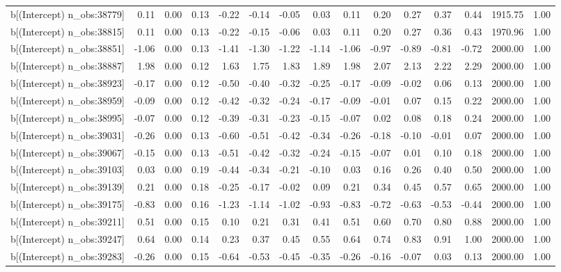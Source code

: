 \begin{table}[ht]
\begin{tabular}{rrrrrrrrrrrrrrr}
  b[(Intercept) n\_obs:38779] & 0.11 & 0.00 & 0.13 & -0.22 & -0.14 & -0.05 & 0.03 & 0.11 & 0.20 & 0.27 & 0.37 & 0.44 & 1915.75 & 1.00 \\ 
  b[(Intercept) n\_obs:38815] & 0.11 & 0.00 & 0.13 & -0.22 & -0.15 & -0.06 & 0.03 & 0.11 & 0.20 & 0.27 & 0.36 & 0.43 & 1970.96 & 1.00 \\ 
  b[(Intercept) n\_obs:38851] & -1.06 & 0.00 & 0.13 & -1.41 & -1.30 & -1.22 & -1.14 & -1.06 & -0.97 & -0.89 & -0.81 & -0.72 & 2000.00 & 1.00 \\ 
  b[(Intercept) n\_obs:38887] & 1.98 & 0.00 & 0.12 & 1.63 & 1.75 & 1.83 & 1.89 & 1.98 & 2.07 & 2.13 & 2.22 & 2.29 & 2000.00 & 1.00 \\ 
  b[(Intercept) n\_obs:38923] & -0.17 & 0.00 & 0.12 & -0.50 & -0.40 & -0.32 & -0.25 & -0.17 & -0.09 & -0.02 & 0.06 & 0.13 & 2000.00 & 1.00 \\ 
  b[(Intercept) n\_obs:38959] & -0.09 & 0.00 & 0.12 & -0.42 & -0.32 & -0.24 & -0.17 & -0.09 & -0.01 & 0.07 & 0.15 & 0.22 & 2000.00 & 1.00 \\ 
  b[(Intercept) n\_obs:38995] & -0.07 & 0.00 & 0.12 & -0.39 & -0.31 & -0.23 & -0.15 & -0.07 & 0.02 & 0.08 & 0.18 & 0.24 & 2000.00 & 1.00 \\ 
  b[(Intercept) n\_obs:39031] & -0.26 & 0.00 & 0.13 & -0.60 & -0.51 & -0.42 & -0.34 & -0.26 & -0.18 & -0.10 & -0.01 & 0.07 & 2000.00 & 1.00 \\ 
  b[(Intercept) n\_obs:39067] & -0.15 & 0.00 & 0.13 & -0.51 & -0.42 & -0.32 & -0.24 & -0.15 & -0.07 & 0.01 & 0.10 & 0.18 & 2000.00 & 1.00 \\ 
  b[(Intercept) n\_obs:39103] & 0.03 & 0.00 & 0.19 & -0.44 & -0.34 & -0.21 & -0.10 & 0.03 & 0.16 & 0.26 & 0.40 & 0.50 & 2000.00 & 1.00 \\ 
  b[(Intercept) n\_obs:39139] & 0.21 & 0.00 & 0.18 & -0.25 & -0.17 & -0.02 & 0.09 & 0.21 & 0.34 & 0.45 & 0.57 & 0.65 & 2000.00 & 1.00 \\ 
  b[(Intercept) n\_obs:39175] & -0.83 & 0.00 & 0.16 & -1.23 & -1.14 & -1.02 & -0.93 & -0.83 & -0.72 & -0.63 & -0.53 & -0.44 & 2000.00 & 1.00 \\ 
  b[(Intercept) n\_obs:39211] & 0.51 & 0.00 & 0.15 & 0.10 & 0.21 & 0.31 & 0.41 & 0.51 & 0.60 & 0.70 & 0.80 & 0.88 & 2000.00 & 1.00 \\ 
  b[(Intercept) n\_obs:39247] & 0.64 & 0.00 & 0.14 & 0.23 & 0.37 & 0.45 & 0.55 & 0.64 & 0.74 & 0.83 & 0.91 & 1.00 & 2000.00 & 1.00 \\ 
  b[(Intercept) n\_obs:39283] & -0.26 & 0.00 & 0.15 & -0.64 & -0.53 & -0.45 & -0.35 & -0.26 & -0.16 & -0.07 & 0.03 & 0.13 & 2000.00 & 1.00 \\ 

\end{tabular}
\end{table}
